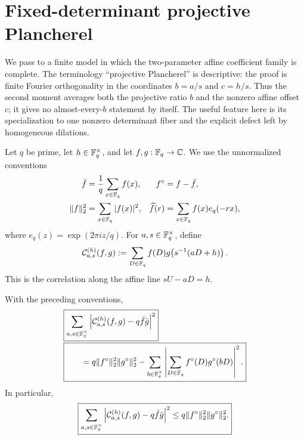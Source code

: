 \section{Fixed-determinant projective Plancherel}
\label{sec:tpc33-projective-plancherel}

We pass to a finite model in which the two-parameter affine coefficient
family is complete.  The terminology ``projective Plancherel'' is
descriptive: the proof is finite Fourier orthogonality in the coordinates
\(b=a/s\) and \(c=h/s\).  Thus the second moment averages both the
projective ratio \(b\) and the nonzero affine offset \(c\); it gives no
almost-every-\(b\) statement by itself.  The useful feature here is its
specialization to one nonzero determinant fiber and the explicit defect
left by homogeneous dilations.

Let \(q\) be prime, let \(h\in\mathbb F_q^\times\), and let
\(f,g:\mathbb F_q\to\mathbb C\).  We use the unnormalized conventions
\begin{align}
 \bar f&=\frac1q\sum_{x\in\mathbb F_q}f(x),
 &f^\circ&=f-\bar f,
 \label{eq:tpc33-finite-centering}\\
 \|f\|_2^2&=\sum_{x\in\mathbb F_q}|f(x)|^2,
 &\widehat f(r)&=\sum_{x\in\mathbb F_q}f(x)e_q(-rx),
 \label{eq:tpc33-finite-normalization}
\end{align}
where \(e_q(z)=\exp(2\pi iz/q)\).  For
\(a,s\in\mathbb F_q^\times\), define
\begin{equation}
 \mathcal C_{a,s}^{(h)}(f,g)
 :=\sum_{D\in\mathbb F_q}
 f(D)g\!\left(s^{-1}(aD+h)\right).
 \label{eq:tpc33-projective-correlation}
\end{equation}
This is the correlation along the affine line \(sU-aD=h\).

\begin{theorem}
\label{thm:tpc33-projective-plancherel}
With the preceding conventions,
\begin{align}
 &\boxed{
 \sum_{a,s\in\mathbb F_q^\times}
 \left|
  \mathcal C_{a,s}^{(h)}(f,g)-q\bar f\bar g
 \right|^2}
 \notag\\[-0.2em]
 &\boxed{\qquad
 =q\|f^\circ\|_2^2\|g^\circ\|_2^2
 -\sum_{b\in\mathbb F_q^\times}
  \left|\sum_{D\in\mathbb F_q}f^\circ(D)g^\circ(bD)\right|^2.}
 \label{eq:tpc33-projective-plancherel}
\end{align}
In particular,
\begin{equation}
 \boxed{
 \sum_{a,s\in\mathbb F_q^\times}
 \left|
  \mathcal C_{a,s}^{(h)}(f,g)-q\bar f\bar g
 \right|^2
 \le q\|f^\circ\|_2^2\|g^\circ\|_2^2.}
 \label{eq:tpc33-projective-upper-bound}
\end{equation}
\end{theorem}

